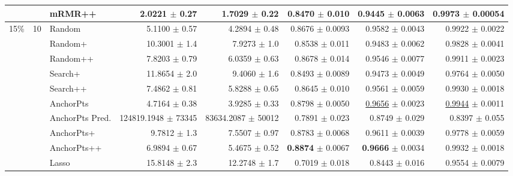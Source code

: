 \begin{longtable}{llp{}rrrrr}
 &  & mRMR++ & 2.0221 {\scriptsize $\pm$ 0.27} & 1.7029 {\scriptsize $\pm$ 0.22} & 0.8470 {\scriptsize $\pm$ 0.010} & 0.9445 {\scriptsize $\pm$ 0.0063} & 0.9973 {\scriptsize $\pm$ 0.00054} \\
\midrule
15\% & 10 & Random & 5.1100 {\scriptsize $\pm$ 0.57} & 4.2894 {\scriptsize $\pm$ 0.48} & 0.8676 {\scriptsize $\pm$ 0.0093} & 0.9582 {\scriptsize $\pm$ 0.0043} & 0.9922 {\scriptsize $\pm$ 0.0022} \\
 &  & Random+ & 10.3001 {\scriptsize $\pm$ 1.4} & 7.9273 {\scriptsize $\pm$ 1.0} & 0.8538 {\scriptsize $\pm$ 0.011} & 0.9483 {\scriptsize $\pm$ 0.0062} & 0.9828 {\scriptsize $\pm$ 0.0041} \\
 &  & Random++ & 7.8203 {\scriptsize $\pm$ 0.79} & 6.0359 {\scriptsize $\pm$ 0.63} & 0.8678 {\scriptsize $\pm$ 0.014} & 0.9546 {\scriptsize $\pm$ 0.0077} & 0.9911 {\scriptsize $\pm$ 0.0023} \\
 &  & Search+ & 11.8654 {\scriptsize $\pm$ 2.0} & 9.4060 {\scriptsize $\pm$ 1.6} & 0.8493 {\scriptsize $\pm$ 0.0089} & 0.9473 {\scriptsize $\pm$ 0.0049} & 0.9764 {\scriptsize $\pm$ 0.0050} \\
 &  & Search++ & 7.4862 {\scriptsize $\pm$ 0.81} & 5.8288 {\scriptsize $\pm$ 0.65} & 0.8645 {\scriptsize $\pm$ 0.010} & 0.9561 {\scriptsize $\pm$ 0.0059} & 0.9930 {\scriptsize $\pm$ 0.0018} \\
 &  & AnchorPts & 4.7164 {\scriptsize $\pm$ 0.38} & 3.9285 {\scriptsize $\pm$ 0.33} & 0.8798 {\scriptsize $\pm$ 0.0050} & \underline{0.9656} {\scriptsize $\pm$ 0.0023} & \underline{0.9944} {\scriptsize $\pm$ 0.0011} \\
 &  & AnchorPts Pred. & 124819.1948 {\scriptsize $\pm$ 73345} & 83634.2087 {\scriptsize $\pm$ 50012} & 0.7891 {\scriptsize $\pm$ 0.023} & 0.8749 {\scriptsize $\pm$ 0.029} & 0.8397 {\scriptsize $\pm$ 0.055} \\
 &  & AnchorPts+ & 9.7812 {\scriptsize $\pm$ 1.3} & 7.5507 {\scriptsize $\pm$ 0.97} & 0.8783 {\scriptsize $\pm$ 0.0068} & 0.9611 {\scriptsize $\pm$ 0.0039} & 0.9778 {\scriptsize $\pm$ 0.0059} \\
 &  & AnchorPts++ & 6.9894 {\scriptsize $\pm$ 0.67} & 5.4675 {\scriptsize $\pm$ 0.52} & \textbf{0.8874} {\scriptsize $\pm$ 0.0067} & \textbf{0.9666} {\scriptsize $\pm$ 0.0034} & 0.9932 {\scriptsize $\pm$ 0.0018} \\
 &  & Lasso & 15.8148 {\scriptsize $\pm$ 2.3} & 12.2748 {\scriptsize $\pm$ 1.7} & 0.7019 {\scriptsize $\pm$ 0.018} & 0.8443 {\scriptsize $\pm$ 0.016} & 0.9554 {\scriptsize $\pm$ 0.0079} \\

\end{longtable}

